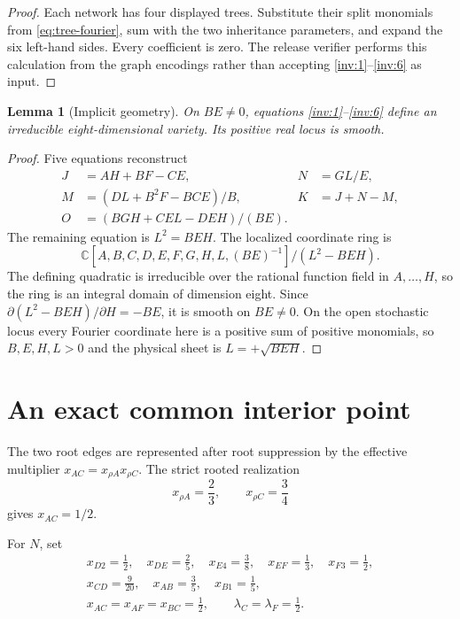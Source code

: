 \documentclass[11pt]{article}
\newtheorem{lemma}[theorem]{Lemma}
\theoremstyle{remark}
\newcommand{\C}{\mathbb C}
\begin{document}
\begin{proof}
Each network has four displayed trees.  Substitute their split monomials
from \eqref{eq:tree-fourier}, sum with the two inheritance parameters, and
expand the six left-hand sides.  Every coefficient is zero.  The release
verifier performs this calculation from the graph encodings rather than
accepting \eqref{inv:1}--\eqref{inv:6} as input.
\end{proof}

\begin{lemma}[Implicit geometry]\label{lem:geometry}
On $BE\ne0$, equations \eqref{inv:1}--\eqref{inv:6} define an irreducible
eight-dimensional variety.  Its positive real locus is smooth.
\end{lemma}

\begin{proof}
Five equations reconstruct
\begin{align}
J&=AH+BF-CE,&
N&=GL/E,\\
M&=(DL+B^2F-BCE)/B,&
K&=J+N-M,\\
O&=(BGH+CEL-DEH)/(BE).
\label{eq:reconstruction}
\end{align}
The remaining equation is $L^2=BEH$.  The localized coordinate ring is
\[
\C[A,B,C,D,E,F,G,H,L,(BE)^{-1}]/(L^2-BEH).
\]
The defining quadratic is irreducible over the rational function field in
$A,\ldots,H$, so the ring is an integral domain of dimension eight.  Since
$\partial(L^2-BEH)/\partial H=-BE$, it is smooth on $BE\ne0$.  On the open
stochastic locus every Fourier coordinate here is a positive sum of positive
monomials, so $B,E,H,L>0$ and the physical sheet is
$L=+\sqrt{BEH}$.
\end{proof}

\section{An exact common interior point}

The two root edges are represented after root suppression by the effective
multiplier $x_{AC}=x_{\rho A}x_{\rho C}$.  The strict rooted realization
\[
x_{\rho A}=\frac23,\qquad x_{\rho C}=\frac34
\]
gives $x_{AC}=1/2$.

For $N$, set
\begin{equation}\label{eq:source-point}
\begin{gathered}
x_{D2}=\frac12,\quad x_{DE}=\frac25,\quad x_{E4}=\frac38,
\quad x_{EF}=\frac13,\quad x_{F3}=\frac12,\\
x_{CD}=\frac9{20},\quad x_{AB}=\frac35,\quad x_{B1}=\frac15,\\
x_{AC}=x_{AF}=x_{BC}=\frac12,\qquad
\lambda_C=\lambda_F=\frac12.
\end{gathered}
\end{equation}
\end{document}
